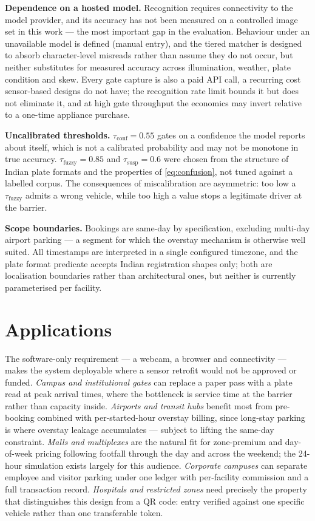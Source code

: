\documentclass[journal,onecolumn,11pt]{IEEEtran}
\begin{document}
\textbf{Dependence on a hosted model.} Recognition requires connectivity to the
model provider, and its accuracy has not been measured on a controlled image
set in this work --- the most important gap in the evaluation. Behaviour under
an unavailable model is defined (manual entry), and the tiered matcher is
designed to absorb character-level misreads rather than assume they do not
occur, but neither substitutes for measured accuracy across illumination,
weather, plate condition and skew. Every gate capture is also a paid API call,
a recurring cost sensor-based designs do not have; the recognition rate limit
bounds it but does not eliminate it, and at high gate throughput the economics
may invert relative to a one-time appliance purchase.

\textbf{Uncalibrated thresholds.} $\tau_{\text{conf}} = 0.55$ gates on a
confidence the model reports about itself, which is not a calibrated
probability and may not be monotone in true accuracy. $\tau_{\text{fuzzy}} =
0.85$ and $\tau_{\text{susp}} = 0.6$ were chosen from the structure of Indian
plate formats and the properties of \eqref{eq:confusion}, not tuned against a
labelled corpus. The consequences of miscalibration are asymmetric: too low a
$\tau_{\text{fuzzy}}$ admits a wrong vehicle, while too high a value stops a
legitimate driver at the barrier.

\textbf{Scope boundaries.} Bookings are same-day by specification, excluding
multi-day airport parking --- a segment for which the overstay mechanism is
otherwise well suited. All timestamps are interpreted in a single configured
timezone, and the plate format predicate accepts Indian registration shapes
only; both are localisation boundaries rather than architectural ones, but
neither is currently parameterised per facility.

\section{Applications}
\label{sec:applications}

The software-only requirement --- a webcam, a browser and connectivity ---
makes the system deployable where a sensor retrofit would not be approved or
funded. \emph{Campus and institutional gates} can replace a paper pass with a
plate read at peak arrival times, where the bottleneck is service time at the
barrier rather than capacity inside. \emph{Airports and transit hubs} benefit
most from pre-booking combined with per-started-hour overstay billing, since
long-stay parking is where overstay leakage accumulates --- subject to lifting
the same-day constraint. \emph{Malls and multiplexes} are the natural fit for
zone-premium and day-of-week pricing following footfall through the day and
across the weekend; the 24-hour simulation exists largely for this audience.
\emph{Corporate campuses} can separate employee and visitor parking under one
ledger with per-facility commission and a full transaction record.
\emph{Hospitals and restricted zones} need precisely the property that
distinguishes this design from a QR code: entry verified against one specific
vehicle rather than one transferable token.
\end{document}
